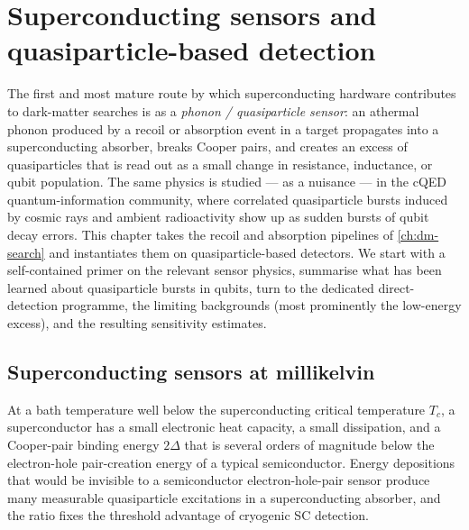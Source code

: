 \chapter{Superconducting sensors and quasiparticle-based detection}
\label{ch:ir-junction}

The first and most mature route by which superconducting hardware
contributes to dark-matter searches is as a \emph{phonon /
quasiparticle sensor}: an athermal phonon produced by a recoil or
absorption event in a target propagates into a superconducting
absorber, breaks Cooper pairs, and creates an excess of
quasiparticles that is read out as a small change in resistance,
inductance, or qubit population. The same physics is studied --- as
a nuisance --- in the cQED quantum-information community, where
correlated quasiparticle bursts induced by cosmic rays and ambient
radioactivity show up as sudden bursts of qubit decay errors. This
chapter takes the recoil and absorption pipelines of
\cref{ch:dm-search} and instantiates them on quasiparticle-based
detectors. We start with a self-contained primer on the relevant
sensor physics, summarise what has been learned about
quasiparticle bursts in qubits, turn to the dedicated
direct-detection programme, the limiting backgrounds (most
prominently the low-energy excess), and the resulting sensitivity
estimates.

\section{Superconducting sensors at millikelvin}
\label{sec:sc-sensors}

\begin{phenomenon}
At a bath temperature well below the superconducting critical
temperature $T_c$, a superconductor has a small electronic heat
capacity, a small dissipation, and a Cooper-pair binding energy
$2\Delta$ that is several orders of magnitude below the
electron-hole pair-creation energy of a typical semiconductor.
Energy depositions that would be invisible to a semiconductor
electron-hole-pair sensor produce many measurable
quasiparticle excitations in a superconducting absorber, and the
ratio fixes the threshold advantage of cryogenic SC detection.
\end{phenomenon}

